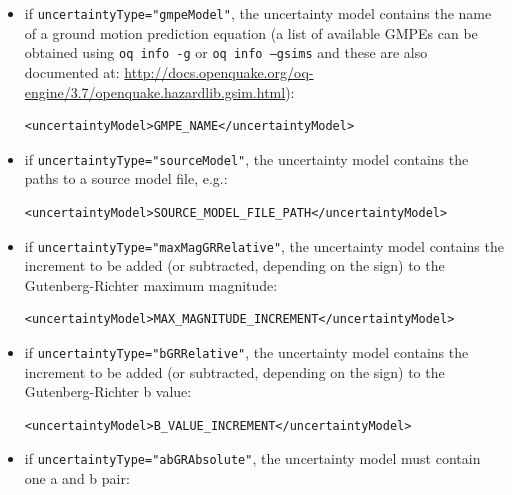 \begin{itemize}

    \item if \Verb+uncertaintyType="gmpeModel"+, the uncertainty model
	contains the name of a ground motion prediction equation (a list of
	available GMPEs can be obtained using \texttt{oq info -g} or 
	\texttt{oq info --gsims} and these are also documented at:
	\href{http://docs.openquake.org/oq-engine/3.7/openquake.hazardlib.gsim.html}{http://docs.openquake.org/oq-engine/3.7/openquake.hazardlib.gsim.html}):

    \begin{verbatim}
<uncertaintyModel>GMPE_NAME</uncertaintyModel>
	\end{verbatim}

    \item if \Verb+uncertaintyType="sourceModel"+, the uncertainty model
	contains the paths to a source model file, e.g.:

    \begin{verbatim}
<uncertaintyModel>SOURCE_MODEL_FILE_PATH</uncertaintyModel>
	\end{verbatim}

    \item if \Verb+uncertaintyType="maxMagGRRelative"+, the uncertainty model
	contains the increment to be added (or subtracted, depending on the sign)
	to the Gutenberg-Richter maximum magnitude:

    \begin{verbatim}
<uncertaintyModel>MAX_MAGNITUDE_INCREMENT</uncertaintyModel>
	\end{verbatim}

    \item if \Verb+uncertaintyType="bGRRelative"+, the uncertainty model
	contains the increment to be added (or subtracted, depending on the sign)
	to the Gutenberg-Richter b value:

    \begin{verbatim}
<uncertaintyModel>B_VALUE_INCREMENT</uncertaintyModel>
	\end{verbatim}

    \item if \Verb+uncertaintyType="abGRAbsolute"+, the uncertainty model
	must contain one a and b pair:


\end{itemize}
